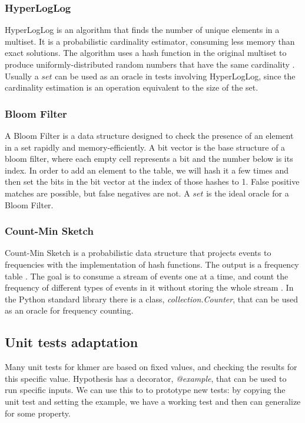 \documentclass[preprint,nocopyrightspace]{sig-alternate}
\begin{document}
\subsubsection{HyperLogLog}
HyperLogLog is an algorithm that finds the number of unique elements in a multiset.
It is a probabilistic cardinality estimator,
consuming less memory than exact solutions.
The algorithm uses a hash function in the original multiset to produce uniformly-distributed random numbers that have the same cardinality \citet{hyperloglog_2007}.
Usually a $set$ can be used as an oracle in tests involving HyperLogLog,
since the cardinality estimation is an operation equivalent to the size of the set.

\subsubsection{Bloom Filter}
A Bloom Filter is a data structure designed to check the presence of an element in a set rapidly and memory-efficiently.
A bit vector is the base structure of a bloom filter,
where each empty cell represents a bit and the number below is its index. \citet{bloom_filter}
In order to add an element to the table,
we will hash it a few times and then set the bits in the bit vector at the index of those hashes to 1.
False positive matches are possible,
but false negatives are not.
A $set$ is the ideal oracle for a Bloom Filter.

\subsubsection{Count-Min Sketch}
Count-Min Sketch is a probabilistic data structure that projects events to frequencies with the implementation of hash functions.
The output is a frequency table \citet{count_min_sketch}.
The goal is to consume a stream of events one at a time,
and count the frequency of different types of events in it without storing the whole stream \citet{count_min_sketch_2005}.
In the Python standard library there is a class,
\emph{collection.Counter},
that can be used as an oracle for frequency counting.

\subsection{Unit tests adaptation}
Many unit tests for khmer are based on fixed values,
and checking the results for this specific value.
Hypothesis has a decorator,
\emph{@example},
that can be used to run specific inputs.
We can use this to to prototype new tests:
by copying the unit test and setting the example,
we have a working test and then can generalize for some property.
\end{document}
